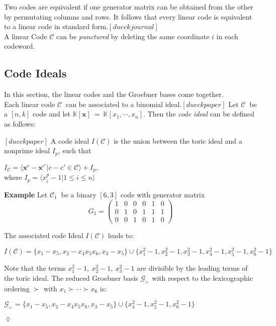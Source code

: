 Two codes are equivalent if one generator matrix can be obtained from the other by permutating columns and rows.
It follows that every linear code is equivalent to a linear code in standard form.$[dueckjournal]$ \\

A linear Code $\mathcal{C}$ can be \textit{punctured} by deleting the same coordinate $i$ in each codeword.


\subsection{Code Ideals}
\label{subsec:codeideals}
In this section, the linear codes and the Groebner bases come together.\\
Each linear code $\mathcal{C}~$ can be associated to a binomial ideal.$[dueckpaper]$ Let $\mathcal{C}~$ be a $[n,k]$ code and let 
$\mathbb{K}[\textbf{x}]~=~\mathbb{K}[x_{1},\cdots,x_{n}]$.
Then the \textit{code ideal} can be defined as follows:

\begin{env_definition}
$[dueckpaper]$ A code ideal $I(\mathcal{C})$ is the union between the toric ideal and a nonprime ideal $I_{p}$, such that
\begin{center}
$ I_{\mathcal{C}} = \langle \textbf{x}^{c} - \textbf{x}^{c'} | c - c' \in \mathcal{C}  \rangle + I_{p},$\\
\textrm{where}
 $I_{p} = \langle x_{i}^{p} - 1 | 1 \leq i \leq n \rangle $
\end{center}
\end{env_definition}


\textbf{Example} Let $\mathcal{C}_{1}~$ be a binary $[6,3]$ code with generator matrix
\[
G_{1} =
\begin{pmatrix}
1 & 0 & 0 & 0 & 1 & 0 \\ 
0 & 1 & 0 & 1 & 1 & 1 \\  
0 & 0 & 1 & 0 & 1 & 0  
\end{pmatrix} 
\]

The associated code Ideal $I(\mathcal{C})$ leads to: \newline
\begin{center}
$I(\mathcal{C}) = \{x_{1}-x_{5},x_{2}-x_{4}x_{5}x_{6},x_{3}-x_{5}  \} \cup \{x_{1}^{2}-1,x_{2}^{2}-1,x_{3}^{2}-1,x_{4}^{2}-1,x_{5}^{2}-1,x_{6}^{2}-1\}  $
\end{center}
Note that the terms $x_{1}^{2}-1,~x_{2}^{2}-1,~x_{3}^{2}-1 $ are divisible by the leading terms of the toric ideal.
The reduced Groebner basis $\mathcal{G}_{\succ}$ with respect to the lexicographic ordering $\succ$ with $x_{1} \succ \cdots \succ x_{6}$ is:
\begin{center}
$ \mathcal{G}_{\succ} = \{x_{1}-x_{5},x_{2}-x_{4}x_{5}x_{6},x_{3}-x_{5}  \} \cup \{x_{4}^{2}-1,x_{5}^{2}-1,x_{6}^{2}-1  \}  $
\end{center}

\begin{flushright}
$\lozenge$
\end{flushright} 

 

\newpage
